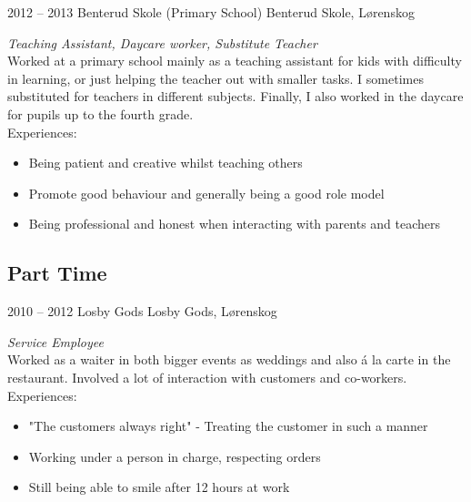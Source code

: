 \documentclass[]{friggeri-cv} %
\begin{document}
\begin{entrylist}


\entry
{2012 -- 2013}
{Benterud Skole (Primary School)}
{Benterud Skole, Lørenskog}
{\emph{Teaching Assistant, Daycare worker, Substitute Teacher} \\
Worked at a primary school mainly as a teaching assistant for kids with difficulty in learning, or just helping the teacher out with smaller tasks. I sometimes substituted for teachers in different subjects. Finally, I also worked in the daycare for pupils up to the fourth grade. \\
Experiences:
\begin{itemize}
\item Being patient and creative whilst teaching others
\item Promote good behaviour and generally being a good role model
\item Being professional and honest when interacting with parents and teachers
\end{itemize}}


\end{entrylist}

\subsection{Part Time}

\begin{entrylist}


\entry
{2010 -- 2012}
{Losby Gods}
{Losby Gods, Lørenskog}
{\emph{Service Employee} \\
Worked as a waiter in both bigger events as weddings and also \'{a} la carte in the restaurant. Involved a lot of 
interaction with customers and co-workers. \\
Experiences:
\begin{itemize}
\item "The customers always right" - Treating the customer in such a manner
\item Working under a person in charge, respecting orders
\item Still being able to smile after 12 hours at work
\end{itemize}}



\end{entrylist}
\end{document}

